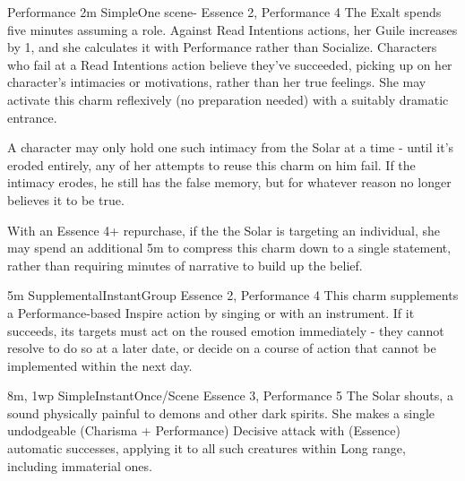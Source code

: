 \begin{Ability}{Performance}
  {2m}
  {Simple}{One scene}{-}
  {Essence 2, Performance 4}
  The Exalt spends five minutes assuming a role. Against Read Intentions actions, her Guile increases by 1, and she calculates it with Performance rather than Socialize. Characters who fail at a Read Intentions action believe they've succeeded, picking up on her character's intimacies or motivations, rather than her true feelings. She may activate this charm reflexively (no preparation needed) with a suitably dramatic entrance.

  A character may only hold one such intimacy from the Solar at a time - until it's eroded entirely, any of her attempts to reuse this charm on him fail. If the intimacy erodes, he still has the false memory, but for whatever reason no longer believes it to be true.

  With an Essence 4+ repurchase, if the the Solar is targeting an individual, she may spend an additional 5m to compress this charm down to a single statement, rather than requiring minutes of narrative to build up the belief.

  {5m}
  {Supplemental}{Instant}{Group}
  {Essence 2, Performance 4}
  This charm supplements a Performance-based Inspire action by singing or with an instrument. If it succeeds, its targets must act on the roused emotion immediately - they cannot resolve to do so at a later date, or decide on a course of action that cannot be implemented within the next day.

  {8m, 1wp}
  {Simple}{Instant}{Once/Scene}
  {Essence 3, Performance 5}
  The Solar shouts, a sound physically painful to demons and other dark spirits. She makes a single undodgeable (Charisma + Performance) Decisive attack with (Essence) automatic successes, applying it to all such creatures within Long range, including immaterial ones.

  \end{Ability}

